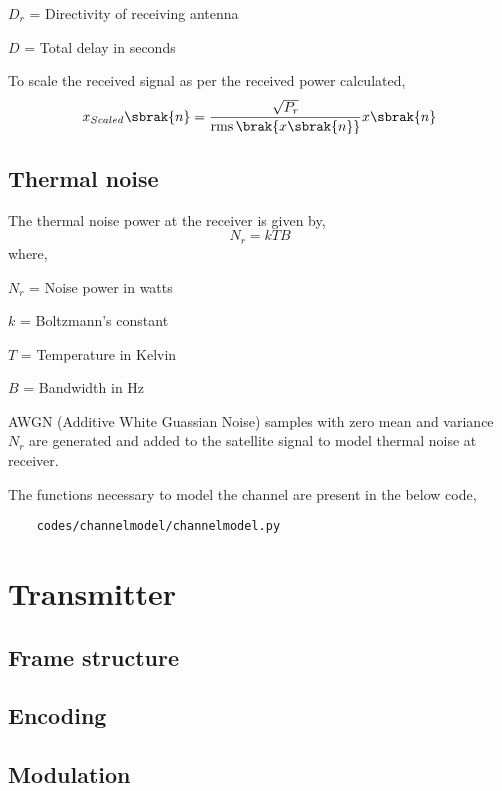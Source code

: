 \documentclass[11pt]{book}
\begin{document}
$D_r$ = Directivity of receiving antenna 

$D$ = Total delay in seconds

To scale the received signal as per the received power calculated,
\begin{equation}
    x_{Scaled}\sbrak{n} = \frac{\sqrt{P_r}}{\operatorname{rms}\brak{x\sbrak{n}}}x\sbrak{n}
\end{equation}   

\section{Thermal noise}
The thermal noise power at the receiver is given by,
\begin{equation}
    N_r = k T B
\end{equation}
where,

$N_r$ = Noise power in watts

$k$ = Boltzmann's constant

$T$ = Temperature in Kelvin

$B$ = Bandwidth in Hz

AWGN (Additive White Guassian Noise) samples with zero mean and variance $N_r$ are generated and added to the satellite signal to model thermal noise at receiver.

The functions necessary to model the channel are present in the below code,
\begin{lstlisting}
    codes/channelmodel/channelmodel.py
\end{lstlisting}

\chapter{Transmitter}

\section{Frame structure}
\section{Encoding}
\section{Modulation}

\backmatter
\appendix
%

\latexprintindex
\end{document}
